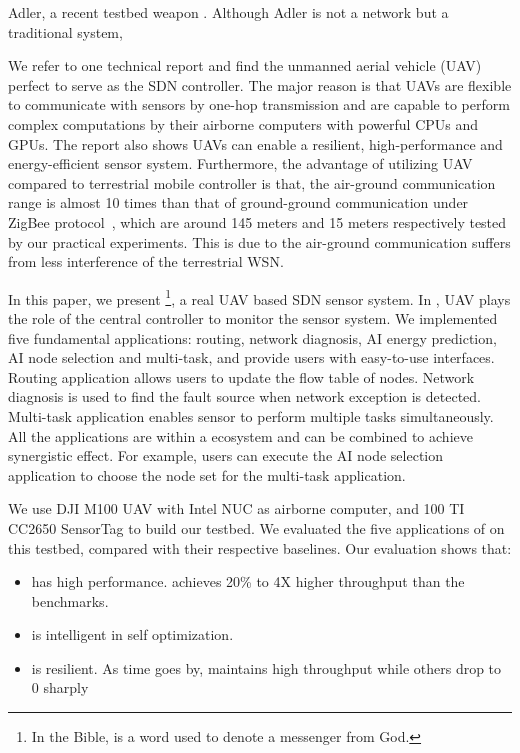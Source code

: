 Adler, a recent testbed weapon
. 
Although Adler is not a network but a traditional system, 


We refer to one technical report \cite{}
and find the unmanned aerial vehicle (UAV) 
\cite{Cambone2005Unmanned, Perry2000Unmanned, Cathcart2014Method}
perfect to serve as the SDN controller.
The major reason is that UAVs are flexible to 
communicate with sensors by one-hop transmission
and are capable to perform complex computations 
by their airborne computers with powerful CPUs and GPUs.
The report also shows UAVs can enable a resilient, 
high-performance and energy-efficient sensor system.
Furthermore, the advantage of utilizing UAV compared to
terrestrial mobile controller is that, the air-ground communication range
is almost 10 times than that of ground-ground communication under ZigBee protocol~\cite{}, which are
around 145 meters and 15 meters respectively tested by our practical experiments.
This is due to the air-ground communication suffers from less interference of the terrestrial WSN.

In this paper, we present {\sdn}\footnote{In the Bible, {\sdn} is a word used to denote a messenger from God. }, 
a real UAV based SDN sensor system.
In {\sdn}, UAV plays the role of the central controller to monitor the sensor system.
We implemented five fundamental applications: routing, network diagnosis, 
AI energy prediction, AI node selection and multi-task,
and provide users with easy-to-use interfaces.
Routing application allows users to update the flow table of nodes.
Network diagnosis is used to find the fault source when network exception is detected.
Multi-task application enables sensor to perform multiple 
tasks simultaneously. All the applications are within a ecosystem
and can be combined to achieve synergistic effect. For example,
users can execute the AI node selection application to choose
the node set for the multi-task application. 


We use DJI M100 UAV with Intel NUC as airborne computer, 
and 100 TI CC2650 SensorTag to build our testbed.
We evaluated the five applications of  {\sdn} on this testbed, 
compared with their respective baselines.
Our evaluation shows that:
\begin{itemize}
\item[1)] {\sdn} has high performance. {\sdn}  achieves 20\% to 4X higher throughput than the benchmarks. 
\item[2)] {\sdn} is intelligent in self optimization.  {\sdn} 
\item[3)] {\sdn} is resilient. As time goes by, {\sdn} maintains high throughput while others drop to $0$ sharply
\end{itemize}

